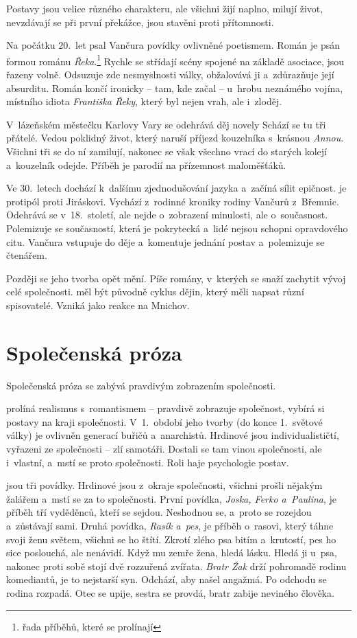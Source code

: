 Postavy jsou velice různého charakteru, ale všichni žijí naplno, milují
život, nevzdávají se při první překážce, jsou stavěni proti přítomnosti.

Na počátku 20.~let psal Vančura povídky ovlivněné poetismem. Román
 je psán formou románu
\emph{Řeka}.\footnote{řada příběhů, které se prolínají} Rychle se
střídají scény spojené na základě asociace, jsou řazeny volně. Odsuzuje
zde nesmyslnosti války, obžalovává ji a~zdůrazňuje její absurditu. Román
končí ironicky -- tam, kde začal -- u~hrobu neznámého vojína, místního
idiota \emph{Františka Řeky}, který byl nejen vrah, ale i~zloděj.

V~lázeňském městečku Karlovy Vary se odehrává děj novely  Schází se tu tři přátelé. Vedou poklidný život, který naruší
příjezd kouzelníka s~krásnou \emph{Annou}. Všichni tři se do ní
zamilují, nakonec se však všechno vrací do starých kolejí a~kouzelník
odejde. Příběh je parodií na přízemnost maloměšťáků.

Ve 30.~letech dochází k~dalšímu zjednodušování jazyka a~začíná sílit
epičnost.  je protipól proti Jiráskovi. Vychází
z~rodinné kroniky rodiny Vančurů z~Břemnic. Odehrává se v~18.~století, ale
nejde o~zobrazení minulosti, ale o~současnost. Polemizuje se
současností, která je pokrytecká a~lidé nejsou schopni opravdového citu.
Vančura vstupuje do děje a~komentuje jednání postav a~polemizuje se
čtenářem.

Později se jeho tvorba opět mění. Píše romány, v~kterých se snaží
zachytit vývoj celé společnosti.  měl
být původně cyklus dějin, který měli napsat různí spisovatelé. Vzniká
jako reakce na Mnichov.

\section{Společenská próza}
Společenská próza se zabývá pravdivým zobrazením společnosti.

 prolíná realismus s~romantismem -- pravdivě
zobrazuje společnost, vybírá si postavy na kraji společnosti.
V~1.~období jeho tvorby (do konce 1.~světové války) je ovlivněn generací
buřičů a~anarchistů. Hrdinové jsou individualističtí, vyřazeni ze
společnosti -- zlí samotáři. Dostali se tam vinou společnosti, ale
i~vlastní, a~mstí se proto společnosti. Roli haje psychologie postav.

 jsou tři povídky. Hrdinové jsou z~okraje
společnosti, všichni prošli nějakým žalářem a~mstí se za to společnosti.
První povídka, \emph{Joska, Ferko a~Paulina}, je příběh tří vyděděnců,
kteří se sejdou. Neshodnou se, a~proto se rozejdou a~zůstávají sami.
Druhá povídka, \emph{Rasík a~pes}, je příběh o~rasovi, který táhne svoji
ženu světem, všichni se ho štítí. Zkrotí zlého psa bitím a~krutostí, pes
ho sice poslouchá, ale nenávidí. Když mu zemře žena, hledá lásku. Hledá
ji u~psa, nakonec proti sobě stojí dvě rozzuřená zvířata. \emph{Bratr
Žak} drží pohromadě rodinu komediantů, je to nejstarší syn. Odchází, aby
našel angažmá. Po odchodu se rodina rozpadá. Otec se upije, sestra se
provdá, bratr zabije neviného člověka.

